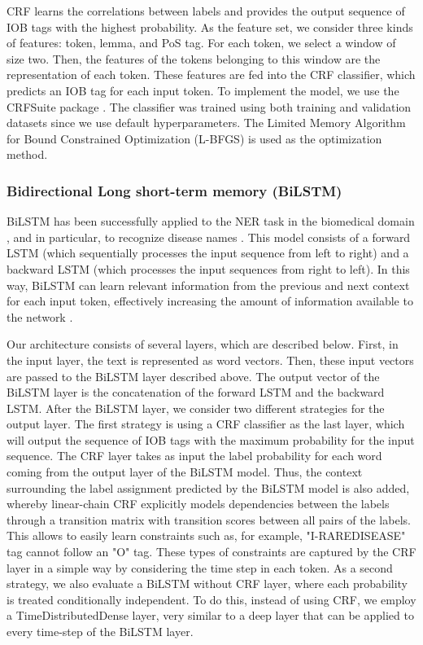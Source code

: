 \documentclass[preprint,12pt]{elsarticle}
\begin{document}
CRF learns the correlations between labels and provides the output sequence of IOB tags with the highest probability. As the feature set, we consider three kinds of features: token, lemma, and PoS tag. For each token, we select a window of size two. Then, the features of the tokens belonging to this window are the representation of each token. These features are fed into the CRF classifier, which predicts an IOB tag for each input token. To implement the model, we use the CRFSuite package \cite{okazakiCRFsuite2007}. The classifier was trained using both training and validation datasets since we use default hyperparameters. The Limited Memory Algorithm for Bound Constrained Optimization (L-BFGS) is used as the optimization method. 



\subsubsection{Bidirectional Long short-term memory (BiLSTM)}

BiLSTM has been successfully applied to the NER task in the biomedical domain \cite{lyu2017long,zeng2017lstm}, and in particular, to recognize disease names \cite{wei2016disease,habibi2017deep,xu2018sblc,ling2019domain}. This model consists of a forward LSTM (which sequentially processes the input sequence from left to right) and a backward LSTM (which processes the input sequences from right to left). In this way, BiLSTM can learn relevant information from the previous and next context for each input token, effectively increasing the amount of information available to the network  \cite{1556215}.

Our architecture consists of several layers, which are described below. First, in the input layer, the text is represented as word vectors. Then, these input vectors are passed to the BiLSTM layer described above. The output vector of the BiLSTM layer is the concatenation of the forward LSTM and the backward LSTM.
After the BiLSTM layer, we consider two different strategies for the output layer. 
The first strategy is using a CRF classifier as the last layer, which will output the sequence of IOB tags with the maximum probability for the input sequence. The CRF layer takes as input the label probability for each word coming from the output layer of the BiLSTM model. Thus, the context surrounding the label assignment predicted by the BiLSTM model is also added, whereby linear-chain CRF explicitly models dependencies between the labels through a transition matrix with transition scores between all pairs of the labels. This allows to easily learn constraints such as, for example,  "I-RAREDISEASE" tag cannot follow an "O" tag. These types of constraints are captured by the CRF layer in a simple way by considering the time step in each token. As a second strategy, we also evaluate a BiLSTM without CRF layer, where each probability is treated conditionally independent. To do this, instead of using CRF, we employ a TimeDistributedDense layer, very similar to a deep layer that can be applied to every time-step of the BiLSTM layer.
\end{document}

